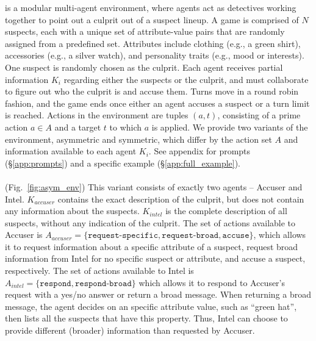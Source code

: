 \ourenv{} is a modular multi-agent environment, where agents act as detectives working together to point out a culprit out of a suspect lineup. A game is comprised of $N$ suspects, each with a unique set of attribute-value pairs that are randomly assigned from a predefined set. Attributes include clothing (e.g., a green shirt), accessories (e.g., a silver watch), and personality traits (e.g., mood or interests). One suspect is randomly chosen as the culprit. Each agent receives partial information $K_i$ regarding either the suspects or the culprit, and must collaborate to figure out who the culprit is and accuse them. Turns move in a round robin fashion, and the game ends once either an agent accuses a suspect or a turn limit is reached.
Actions in the environment are tuples $(a,t)$, consisting of a prime action $a\in A$ and a target $t$ to which $a$ is applied.
We provide two variants of the environment, asymmetric and symmetric, which differ by the action set $A$ and information available to each agent $K_i$. See appendix for prompts (\S\ref{app:prompts}) and a specific example (\S\ref{app:full_example}).

\paragraph{\ourenvasym{}} (Fig.~\ref{fig:asym_env})
This variant consists of exactly two agents -- Accuser and Intel. $K_{accuser}$ contains the exact description of the culprit, but does not contain any information about the suspects. $K_{intel}$ is the complete description of all suspects, without any indication of the culprit. The set of actions available to Accuser is $A_{accuser}=\{\texttt{request-specific}, \texttt{request-broad}, \texttt{accuse}\}$, which allows it to request information about a specific attribute of a suspect, request broad information from Intel for no specific suspect or attribute, and accuse a suspect, respectively. The set of actions available to Intel is $A_{intel}=\{\texttt{respond}, \texttt{respond-broad}\}$ which allows it to respond to Accuser's request with a yes/no answer or return a broad message. When returning a broad message, the agent decides on an specific attribute value, such as ``green hat'', then lists all the suspects that have this property. Thus, Intel can choose to provide different (broader) information than requested by Accuser.



